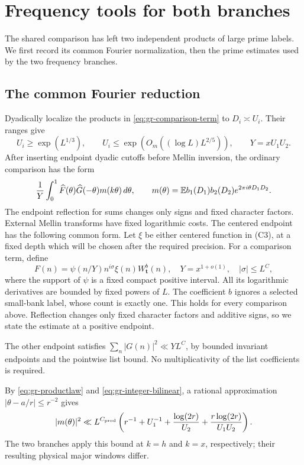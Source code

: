 \section{Frequency tools for both branches}\label{sec:prime-estimates}

The shared comparison has left two independent products of large
prime labels. We first record its common Fourier normalization, then
the prime estimates used by the two frequency branches.

\subsection{The common Fourier reduction}

Dyadically localize the products in
\eqref{eq:gr-comparison-term} to \(D_i\asymp U_i\). Their ranges give
\[
 U_i\ge\exp(L^{1/3}),\qquad
 U_i\le\exp(O_m((\log L)L^{2/5})),\qquad Y=xU_1U_2.
\]
After inserting endpoint dyadic cutoffs before Mellin inversion, the
ordinary comparison has the form
\begin{equation}\label{eq:gr-fouriercomparison}
 \frac1Y\int_0^1\widehat F(\theta)\widehat G(-\theta)
                           m(k\theta)\,d\theta,\qquad
 m(\theta)=\mathbb E b_1(D_1)b_2(D_2)e^{2\pi i \theta D_1D_2}.
\end{equation}
The endpoint reflection for sums changes only signs and fixed character
factors. External Mellin transforms have fixed logarithmic costs.
The centered endpoint has the following common form.
Let \(\xi\) be either centered function in \textup{(C3)}, at a
fixed depth which will be chosen after the required precision.
For a comparison term, define
\begin{equation}
 F(n)=\psi(n/Y)n^{i\sigma}\xi(n)W_{\mathbf t}^b(n),
 \quad Y=x^{1+o(1)},\quad |\sigma|\le L^C,             \label{eq:gr-energy-F}
\end{equation}
where the support of \(\psi\) is a fixed compact positive interval.
All its logarithmic derivatives are bounded by fixed powers of \(L\).
The coefficient \(b\) ignores a selected small-bank label, whose count
is exactly one.  This holds for every comparison above.
Reflection changes only fixed character factors and additive signs,
so we state the estimate at a positive endpoint.


The other endpoint satisfies \(\sum_n|G(n)|^2\ll YL^C\), by
bounded invariant endpoints and the pointwise list bound. No
multiplicativity of the list coefficients is required.

By \eqref{eq:gr-productlaw} and
\eqref{eq:gr-integer-bilinear}, a rational approximation
\(|\theta-a/r|\le r^{-2}\) gives
\begin{equation}\label{eq:gr-multiplier}
 |m(\theta)|^2\ll L^{C_{\rm prod}}
 \left(r^{-1}+U_1^{-1}+\frac{\log(2r)}{U_2}
                    +\frac{r\log(2r)}{U_1U_2}\right).
\end{equation}
The two branches apply this bound at \(k=h\) and \(k=x\),
respectively; their resulting physical major windows differ.

